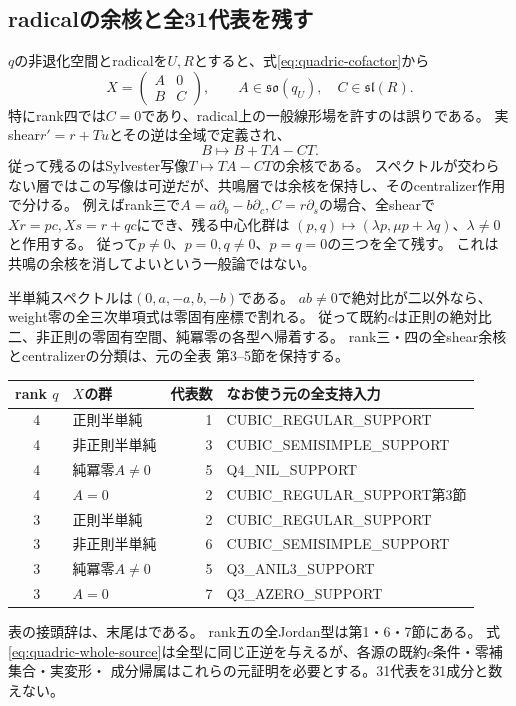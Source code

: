 \subsection{radicalの余核と全31代表を残す}
$q$の非退化空間とradicalを$U,R$とすると、式\eqref{eq:quadric-cofactor}から
\[
 X=\begin{pmatrix}A&0\\ B&C\end{pmatrix},\qquad
 A\in\mathfrak{so}(q_U),\quad C\in\mathfrak{sl}(R).
\]
特にrank四では$C=0$であり、radical上の一般線形場を許すのは誤りである。
実shear$r'=r+Tu$とその逆は全域で定義され、
\begin{equation}
 B\longmapsto B+TA-CT.\label{eq:quadric-sylvester}
\end{equation}
従って残るのはSylvester写像$T\mapsto TA-CT$の余核である。
スペクトルが交わらない層ではこの写像は可逆だが、共鳴層では余核を保持し、そのcentralizer作用で分ける。
例えばrank三で$A=a\partial_b-b\partial_c,C=r\partial_s$の場合、全shearで
$Xr=pc,Xs=r+qc$にでき、残る中心化群は
$(p,q)\mapsto(\lambda p,\mu p+\lambda q)$、$\lambda\ne0$と作用する。
従って$p\ne0$、$p=0,q\ne0$、$p=q=0$の三つを全て残す。
これは共鳴の余核を消してよいという一般論ではない。

半単純スペクトルは$(0,a,-a,b,-b)$である。
$ab\ne0$で絶対比が二以外なら、weight零の全三次単項式は零固有座標で割れる。
従って既約$c$は正則の絶対比二、非正則の零固有空間、純冪零の各型へ帰着する。
rank三・四の全shear余核とcentralizerの分類は、元の全表
第3--5節を保持する。
\begin{center}\small
\begin{tabular}{c|l|r|l}
rank $q$&$X$の群&代表数&なお使う元の全支持入力\\\hline
4&正則半単純&1&CUBIC\_REGULAR\_SUPPORT\\
4&非正則半単純&3&CUBIC\_SEMISIMPLE\_SUPPORT\\
4&純冪零$A\ne0$&5&Q4\_NIL\_SUPPORT\\
4&$A=0$&2&CUBIC\_REGULAR\_SUPPORT第3節\\
3&正則半単純&2&CUBIC\_REGULAR\_SUPPORT\\
3&非正則半単純&6&CUBIC\_SEMISIMPLE\_SUPPORT\\
3&純冪零$A\ne0$&5&Q3\_ANIL3\_SUPPORT\\
3&$A=0$&7&Q3\_AZERO\_SUPPORT
\end{tabular}
\end{center}
表の接頭辞は、末尾はである。
rank五の全Jordan型は第1・6・7節にある。
式\eqref{eq:quadric-whole-source}は全型に同じ正逆を与えるが、各源の既約$c$条件・零補集合・実変形・
成分帰属はこれらの元証明を必要とする。31代表を31成分と数えない。

